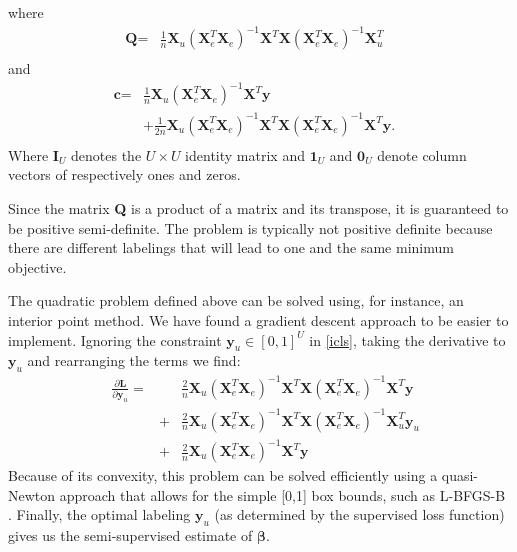 \documentclass{llncs}
\newcommand{\Nunl}{U}
\newcommand{\Xe}{\mathbf{X}_e  }
\newcommand{\G}{\left(\Xe^T \Xe \right)^{-1}}
\begin{document}
where
\begin{equation}
\begin{aligned}
\textbf{Q} = & \frac{1}{n}  \textbf{X}_u \G \textbf{X}^T \textbf{X} \G \textbf{X}_u^T &\\
\end{aligned} \nonumber
\end{equation}
and
\begin{equation}
\begin{aligned}
\textbf{c} = & \frac{1}{n}  \textbf{X}_u \G \textbf{X}^T  \textbf{y} & \\
& + \frac{1}{2 n} \textbf{X}_u \G \textbf{X}^T \textbf{X} \G \textbf{X}^T \textbf{y}. &\\
\end{aligned} \nonumber
\end{equation}
Where $\textbf{I}_{\Nunl}$ denotes the $\Nunl \times \Nunl$ identity matrix and $\textbf{1}_{\Nunl}$ and $\textbf{0}_{\Nunl}$ denote column vectors of respectively ones and zeros.

Since the matrix \textbf{Q} is a product of a matrix and its transpose, it is guaranteed to be positive semi-definite. The problem is typically not positive definite because there are different labelings that will lead to one and the same minimum objective. 

The quadratic problem defined above can be solved using, for instance, an interior point method. We have found a gradient descent approach to be easier to implement. Ignoring the constraint $\textbf{y}_u \in [0,1]^{\Nunl}$ in \eqref{icls}, taking the derivative to $\textbf{y}_u$ and rearranging the terms we find: 
\begin{equation}
\begin{aligned}
&\frac { \partial \textbf{L} }{ \partial \textbf{y}_u } = & & \frac{2}{n}  \textbf{X}_u \G \textbf{X}^T \textbf{X} \G \textbf{X}^T \textbf{y}  \\
& & + & \frac{2}{n}  \textbf{X}_u \G \textbf{X}^T  \textbf{X}  \G  \textbf{X}_u^T \textbf{y}_u  \\
& & + & \frac{2}{n}  \textbf{X}_u \G \textbf{X}^T  \textbf{y}
\end{aligned}
\end{equation}
Because of its convexity, this problem can be solved efficiently using a quasi-Newton approach that allows for the simple [0,1] box bounds, such as L-BFGS-B \cite{Byrd1995}. Finally, the optimal labeling $\textbf{y}_u$ (as determined by the supervised loss function) gives us the semi-supervised estimate of $\boldsymbol{\beta}$.
\end{document}
